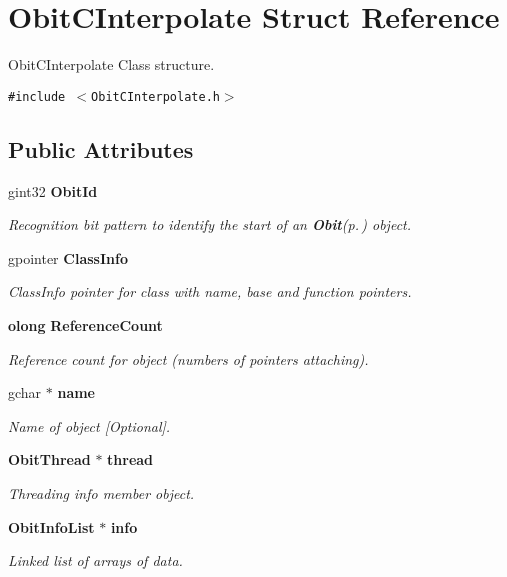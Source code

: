 \section{Obit\-CInterpolate Struct Reference}
\label{structObitCInterpolate}
Obit\-CInterpolate Class structure.  


{\tt \#include $<$Obit\-CInterpolate.h$>$}

\subsection*{Public Attributes}
\begin{CompactItemize}
\item 
gint32 {\bf Obit\-Id}
\begin{CompactList}\small\item\em Recognition bit pattern to identify the start of an {\bf Obit}{\rm (p.\,\pageref{structObit})} object. \item\end{CompactList}\item 
gpointer {\bf Class\-Info}
\begin{CompactList}\small\item\em Class\-Info pointer for class with name, base and function pointers. \item\end{CompactList}\item 
{\bf olong} {\bf Reference\-Count}
\begin{CompactList}\small\item\em Reference count for object (numbers of pointers attaching). \item\end{CompactList}\item 
gchar $\ast$ {\bf name}
\begin{CompactList}\small\item\em Name of object [Optional]. \item\end{CompactList}\item 
{\bf Obit\-Thread} $\ast$ {\bf thread}
\begin{CompactList}\small\item\em Threading info member object. \item\end{CompactList}\item 
{\bf Obit\-Info\-List} $\ast$ {\bf info}
\begin{CompactList}\small\item\em Linked list of arrays of data. \item\end{CompactList}\item 

\end{CompactItemize}
